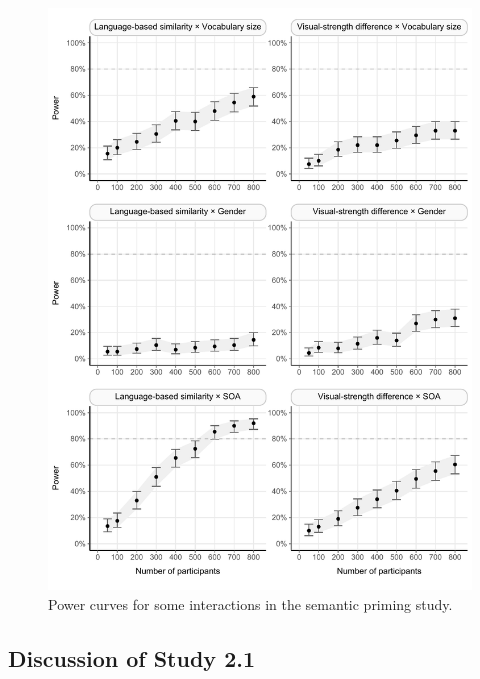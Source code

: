 \documentclass[
  12pt,
  man,floatsintext]{apa7}
\begin{document}
\begin{figure}

{\centering \includegraphics[width=0.92\linewidth]{../semanticpriming/power_analysis/plots/semanticpriming_powercurve_plots_4_5_6_7_8_9} 

}

\caption{Power curves for some interactions in the semantic priming study.}\label{fig:semanticpriming-powercurve-plots-4-5-6-7-8-9}
\end{figure}

\hypertarget{discussion-of-study-2.1}{%
\subsection{Discussion of Study 2.1}\label{discussion-of-study-2.1}}
\end{document}
